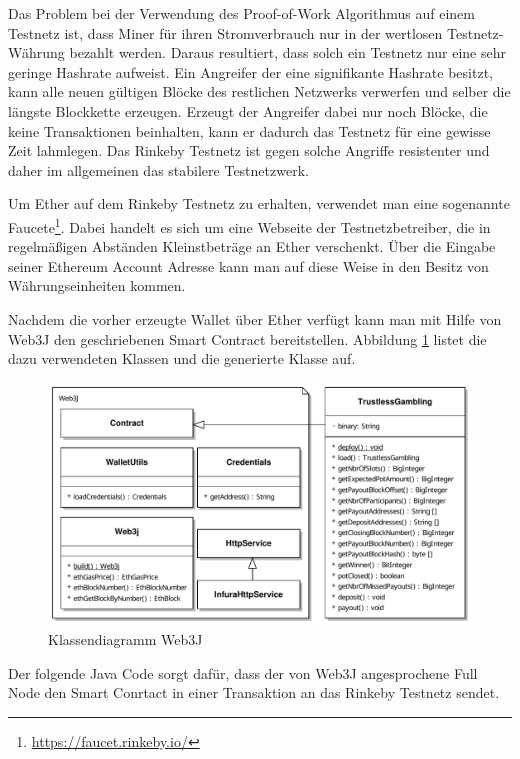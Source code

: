 Das Problem bei der Verwendung des Proof-of-Work Algorithmus auf einem Testnetz ist, dass Miner für ihren Stromverbrauch nur in der wertlosen Testnetz-Währung bezahlt werden. Daraus resultiert, dass solch ein Testnetz nur eine sehr geringe Hashrate aufweist. Ein Angreifer der eine signifikante Hashrate besitzt, kann alle neuen gültigen Blöcke des restlichen Netzwerks verwerfen und selber die längste Blockkette erzeugen. Erzeugt der Angreifer dabei nur noch Blöcke, die keine Transaktionen beinhalten, kann er dadurch das Testnetz für eine gewisse Zeit lahmlegen. Das Rinkeby Testnetz ist gegen solche Angriffe resistenter und daher im allgemeinen das stabilere Testnetzwerk. 

Um Ether auf dem Rinkeby Testnetz zu erhalten, verwendet man eine sogenannte Faucete\footnote{\url{https://faucet.rinkeby.io/}}. Dabei handelt es sich um eine Webseite der Testnetzbetreiber, die in regelmäßigen Abständen Kleinstbeträge an Ether verschenkt. Über die Eingabe seiner Ethereum Account Adresse kann man auf diese Weise in den Besitz von Währungseinheiten kommen.

Nachdem die vorher erzeugte Wallet über Ether verfügt kann man mit Hilfe von Web3J den geschriebenen Smart Contract bereitstellen. Abbildung \ref{fig:eth_web3j} listet die dazu verwendeten Klassen und die generierte  Klasse auf.

\begin{figure}[H]
\centering
\includegraphics[width=1\linewidth]{Figures/umsetzung_eth/eth_web3j}
\decoRule
\caption{Klassendiagramm Web3J}
\label{fig:eth_web3j}
\end{figure}

Der folgende Java Code sorgt dafür, dass der von Web3J angesprochene Full Node den Smart Conrtact in einer Transaktion an das Rinkeby Testnetz sendet.

